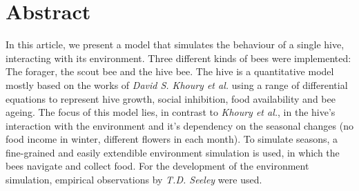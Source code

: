 \section*{Abstract}
In this article, we present a model that simulates the behaviour of a single hive, interacting with its environment. Three different kinds of bees were implemented: The forager, the scout bee and the hive bee. The hive is a quantitative model mostly based on the works of \textit{David S. Khoury et al.} \cite{khoury13} using a range of differential equations to represent hive growth, social inhibition, food availability and bee ageing. The focus of this model lies, in contrast to \textit{Khoury et al.}, in the hive's interaction with the environment and it's dependency on the seasonal changes (no food income in winter, different flowers in each month). To simulate seasons, a fine-grained and easily extendible environment simulation is used, in which the bees navigate and collect food. For the development of the environment simulation, empirical observations by \textit{T.D. Seeley} \cite{seeley95} were used.